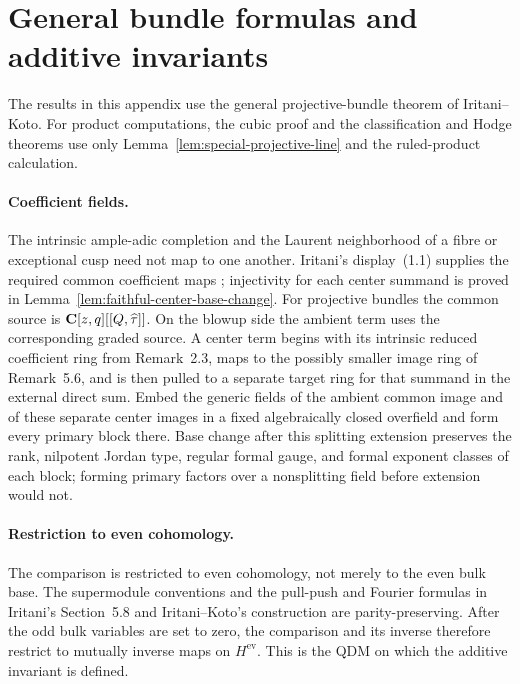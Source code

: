 \section{General bundle formulas and additive invariants}
\label{sec:general-operations}
The results in this appendix use the general projective-bundle theorem of
Iritani--Koto. For product computations, the cubic proof and the classification and Hodge
theorems use only Lemma~\ref{lem:special-projective-line} and the ruled-product
calculation.

\paragraph{Coefficient fields.}
The intrinsic ample-adic completion and the Laurent neighborhood of a
fibre or exceptional cusp need not map to one another.  Iritani's
display~(1.1) supplies the required common coefficient maps
\cite[(1.1)]{IritaniBlowup}; injectivity for each center summand is
proved in Lemma~\ref{lem:faithful-center-base-change}.  For projective bundles the common source is
\(\mathbf C[z,q][[Q,\widehat\tau]]\).  On the blowup side the ambient term uses the
corresponding graded source.  A center term begins with its intrinsic reduced
coefficient ring from Remark~2.3, maps to the possibly smaller image ring of
Remark~5.6, and is then pulled to a separate target ring for that summand in
the external direct sum.  Embed the generic fields of the ambient common image
and of these separate center images in a fixed algebraically closed overfield
and form every primary block there.  Base
change after this splitting extension preserves the rank, nilpotent Jordan
type, regular formal gauge, and formal exponent classes of each block; forming
primary factors over a nonsplitting field before extension would not.

\paragraph{Restriction to even cohomology.}
The comparison is restricted to even cohomology, not merely to the
even bulk base.  The supermodule conventions and the pull-push and Fourier
formulas in Iritani's Section~5.8 and Iritani--Koto's construction are
parity-preserving.  After the odd bulk variables are set to zero, the
comparison and its inverse therefore restrict to mutually inverse maps on
\(H^{\mathrm{ev}}\).  This is the QDM on which the additive invariant is defined.

